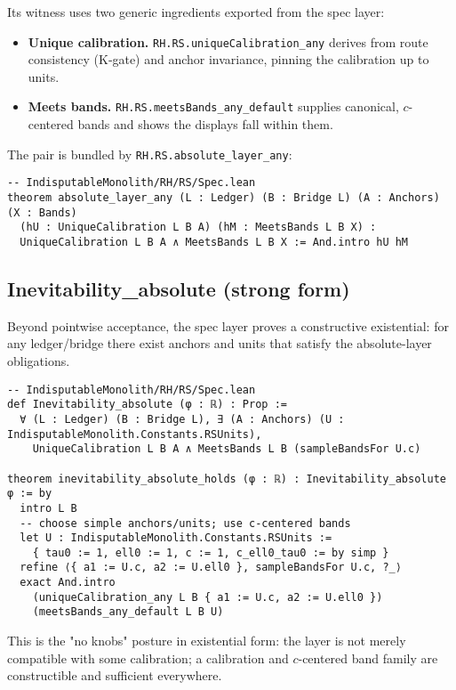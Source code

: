 \documentclass[11pt,a4paper,twoside]{article}
\numberwithin{equation}{section}
\theoremstyle{customthm}
\theoremstyle{customdef}
\theoremstyle{customrem}
\begin{document}
\noindent Its witness uses two generic ingredients exported from the spec layer:
\begin{itemize}[leftmargin=*]
  \item \textbf{Unique calibration.} \texttt{RH.RS.uniqueCalibration\_any} derives from route consistency (K‑gate) and anchor invariance, pinning the calibration up to units.
  \item \textbf{Meets bands.} \texttt{RH.RS.meetsBands\_any\_default} supplies canonical, \(c\)-centered bands and shows the displays fall within them.
\end{itemize}

\noindent The pair is bundled by \texttt{RH.RS.absolute\_layer\_any}:
\begin{lstlisting}
-- IndisputableMonolith/RH/RS/Spec.lean
theorem absolute_layer_any (L : Ledger) (B : Bridge L) (A : Anchors) (X : Bands)
  (hU : UniqueCalibration L B A) (hM : MeetsBands L B X) :
  UniqueCalibration L B A ∧ MeetsBands L B X := And.intro hU hM
\end{lstlisting}

\subsection{Inevitability\_absolute (strong form)}

\noindent Beyond pointwise acceptance, the spec layer proves a constructive existential: for any ledger/bridge there exist anchors and units that satisfy the absolute-layer obligations.

\begin{lstlisting}
-- IndisputableMonolith/RH/RS/Spec.lean
def Inevitability_absolute (φ : ℝ) : Prop :=
  ∀ (L : Ledger) (B : Bridge L), ∃ (A : Anchors) (U : IndisputableMonolith.Constants.RSUnits),
    UniqueCalibration L B A ∧ MeetsBands L B (sampleBandsFor U.c)

theorem inevitability_absolute_holds (φ : ℝ) : Inevitability_absolute φ := by
  intro L B
  -- choose simple anchors/units; use c-centered bands
  let U : IndisputableMonolith.Constants.RSUnits :=
    { tau0 := 1, ell0 := 1, c := 1, c_ell0_tau0 := by simp }
  refine ⟨{ a1 := U.c, a2 := U.ell0 }, sampleBandsFor U.c, ?_⟩
  exact And.intro
    (uniqueCalibration_any L B { a1 := U.c, a2 := U.ell0 })
    (meetsBands_any_default L B U)
\end{lstlisting}

\noindent This is the "no knobs" posture in existential form: the layer is not merely compatible with some calibration; a calibration and \(c\)-centered band family are constructible and sufficient everywhere.
\end{document}
